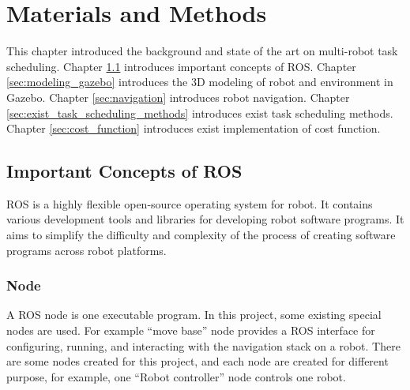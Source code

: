 \chapter{Materials and Methods}




This chapter introduced the background and state of the art on multi-robot task scheduling. Chapter \ref{sec:ros_concepts} introduces important concepts of ROS. Chapter \ref{sec:modeling_gazebo} introduces the 3D modeling of robot and environment in Gazebo. Chapter \ref{sec:navigation} introduces robot navigation. Chapter \ref{sec:exist_task_scheduling_methods} introduces exist task scheduling methods. Chapter \ref{sec:cost_function} introduces exist implementation of cost function.

\section{Important Concepts of ROS}
\label{sec:ros_concepts}
ROS is a highly flexible open-source operating system for robot. It contains various development tools and libraries for developing robot software programs\cite{Pyo17}. It aims to simplify the difficulty and complexity of the process of creating software programs across robot platforms.

\subsection{Node}
A ROS node is one executable program. In this project, some existing special nodes are used. For example ``move base'' node provides a ROS interface for configuring, running, and interacting with the navigation stack on a robot. There are some nodes created for this project, and each node are created for different purpose, for example, one ``Robot controller'' node controls one robot. 

